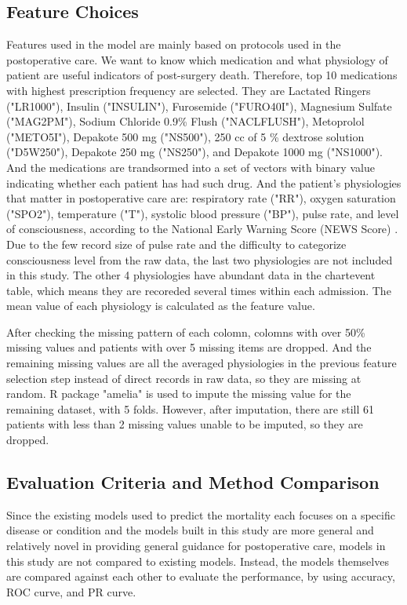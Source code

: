 \documentclass[twoside,11pt]{article}
\begin{document}
\subsection{Feature Choices} 
Features used in the model are mainly based on protocols used in the postoperative care. We want to know which medication and what physiology of patient are useful indicators of post-surgery death. Therefore, top 10 medications with highest prescription frequency are selected. They are Lactated Ringers ("LR1000"), Insulin ("INSULIN"), Furosemide ("FURO40I"), Magnesium Sulfate ("MAG2PM"), Sodium Chloride 0.9\% Flush ("NACLFLUSH"), Metoprolol ("METO5I"), Depakote 500 mg ("NS500"), 250 cc of 5 \% dextrose solution ("D5W250"), Depakote 250 mg ("NS250"), and Depakote 1000 mg ("NS1000"). And the medications are trandsormed into a set of vectors with binary value indicating whether each patient has had such drug. And the patient's physiologies that matter in postoperative care are: respiratory rate ("RR"), oxygen saturation ("SPO2"), temperature ("T"), systolic blood pressure ("BP"), pulse rate, and level of consciousness, according to the National Early Warning Score (NEWS Score) \citet{cite6}. Due to the few record size of pulse rate and the difficulty to categorize consciousness level from the raw data, the last two physiologies are not included in this study. The other 4 physiologies have abundant data in the chartevent table, which means they are recoreded several times within each admission. The mean value of each physiology is calculated as the feature value. 

After checking the missing pattern of each colomn, colomns with over 50\% missing values and patients with over 5 missing items are dropped. And the remaining missing values are all the averaged physiologies in the previous feature selection step instead of direct records in raw data, so they are missing at random. R package "amelia" is used to impute the missing value for the remaining dataset, with 5 folds. However, after imputation, there are still 61 patients with less than 2 missing values unable to be imputed, so they are dropped.

\subsection{Evaluation Criteria and Method Comparison}
Since the existing models used to predict the mortality each focuses on a specific disease or condition and the models built in this study are more general and relatively novel in providing general guidance for postoperative care, models in this study are not compared to existing models. Instead, the models themselves are compared against each other to evaluate the performance, by using accuracy, ROC curve, and PR curve.
\end{document}
